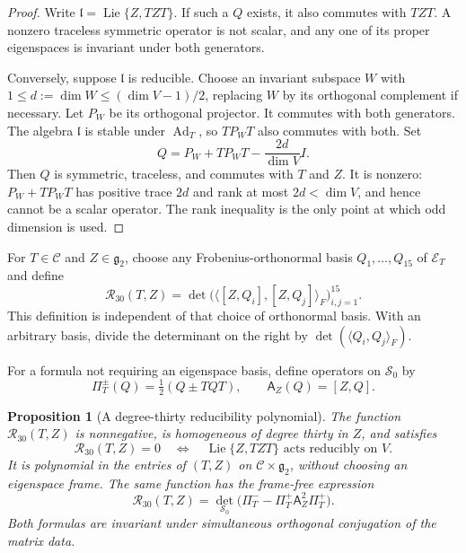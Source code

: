 \documentclass[11pt,a4paper]{article}
\newtheorem{proposition}[proposition]{Proposition}
\newcommand{\Lie}{\operatorname{Lie}}
\newcommand{\Ad}{\operatorname{Ad}}
\begin{document}
\begin{proof}
Write $\mathfrak l=\Lie\{Z,TZT\}$.  If such a $Q$ exists, it also commutes with $TZT$.  A nonzero traceless symmetric operator is not scalar, and any one of its proper eigenspaces is invariant under both generators.

Conversely, suppose $\mathfrak l$ is reducible.  Choose an invariant subspace $W$ with $1\le d:=\dim W\le(\dim V-1)/2$, replacing $W$ by its orthogonal complement if necessary.  Let $P_W$ be its orthogonal projector.  It commutes with both generators.  The algebra $\mathfrak l$ is stable under $\Ad_T$, so $TP_WT$ also commutes with both.  Set
\[
Q=P_W+TP_WT-\frac{2d}{\dim V}I.
\]
Then $Q$ is symmetric, traceless, and commutes with $T$ and $Z$.  It is nonzero: $P_W+TP_WT$ has positive trace $2d$ and rank at most $2d<\dim V$, and hence cannot be a scalar operator.  The rank inequality is the only point at which odd dimension is used.
\end{proof}

For $T\in\mathscr C$ and $Z\in\mathfrak g_2$, choose any Frobenius-orthonormal basis $Q_1,\ldots,Q_{15}$ of $\mathscr E_T$ and define
\begin{equation}
\mathcal R_{30}(T,Z)
=\det\bigl(\langle[Z,Q_i],[Z,Q_j]\rangle_F\bigr)_{i,j=1}^{15}.
\label{eq:R30-gram}
\end{equation}
This definition is independent of that choice of orthonormal basis.  With an arbitrary basis, divide the determinant on the right by $\det(\langle Q_i,Q_j\rangle_F)$.

For a formula not requiring an eigenspace basis, define operators on $\mathscr S_0$ by
\[
\Pi_T^{\pm}(Q)=\tfrac12(Q\pm TQT),\qquad
\mathsf A_Z(Q)=[Z,Q].
\]

\begin{proposition}[A degree-thirty reducibility polynomial]
\label{prop:reducibility-polynomial}
The function $\mathcal R_{30}(T,Z)$ is nonnegative, is homogeneous of degree thirty in $Z$, and satisfies
\[
\mathcal R_{30}(T,Z)=0
\quad\Longleftrightarrow\quad
\Lie\{Z,TZT\}\text{ acts reducibly on }V.
\]
It is polynomial in the entries of $(T,Z)$ on $\mathscr C\times\mathfrak g_2$, without choosing an eigenspace frame.  The same function has the frame-free expression
\begin{equation}
\mathcal R_{30}(T,Z)
=\det_{\mathscr S_0}
\bigl(\Pi_T^- -\Pi_T^+\mathsf A_Z^2\Pi_T^+\bigr).
\label{eq:R30-framefree}
\end{equation}
Both formulas are invariant under simultaneous orthogonal conjugation of the matrix data.
\end{proposition}
\end{document}
